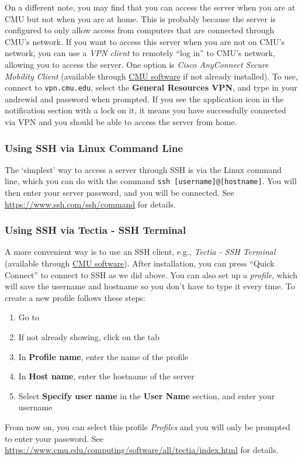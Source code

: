 \documentclass[12pt]{article}
\begin{document}
On a different note, you may find that you can access the server when you are at CMU but not when you are at home.
This is probably because the server is configured to only allow access from computers that are connected through CMU's network.
If you want to access this server when you are not on CMU's network, you can use a \emph{VPN client} to remotely ``log in'' to CMU's network, allowing you to access the server.
One option is \emph{Cisco AnyConnect Secure Mobility Client} (available through \href{https://www.cmu.edu/computing/software}{CMU software} if not already installed).
To use, connect to \texttt{vpn.cmu.edu}, select the \textbf{General Resources VPN}, and type in your andrewid and password when prompted.
If you see the application icon in the notification section with a lock on it, it means you have successfully connected via VPN and you should be able to access the server from home.

\subsubsection{Using SSH via Linux Command Line}
The `simplest' way to access a server through SSH is via the Linux command line, which you can do with the command \texttt{ssh [username]@[hostname]}.
You will then enter your server password, and you will be connected.
See \url{https://www.ssh.com/ssh/command} for details.

\subsubsection{Using SSH via Tectia - SSH Terminal}
A more convenient way is to use an SSH client, e.g., \emph{Tectia - SSH Terminal} (available through \href{https://www.cmu.edu/computing/software}{CMU software}).
After installation, you can press ``Quick Connect'' to connect to SSH as we did above.
You can also set up a \emph{profile}, which will save the username and hostname so you don't have to type it every time.
To create a new profile follows these steps:
\begin{enumerate}
    \item Go to 
    \item If not already showing, click on the  tab
    \item In \textbf{Profile name}, enter the name of the profile
    \item In \textbf{Host name}, enter the hostname of the server
    \item Select \textbf{Specify user name} in the \textbf{User Name} section, and enter your username
\end{enumerate}
From now on, you can select this profile \emph{Profiles} and you will only be prompted to enter your password.
See \url{https://www.cmu.edu/computing/software/all/tectia/index.html} for details.
\end{document}
